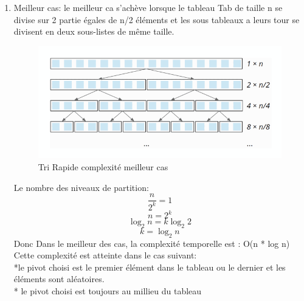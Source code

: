    \begin{enumerate}
    \item Meilleur cas: le meilleur ca s'achève lorsque le tableau Tab de taille n se divise sur 2 partie égales de n/2 éléments et les sous tableaux a leurs tour se divisent en deux sous-listes de même taille.
      \begin{figure} [H]
        \centering
        \includegraphics[scale=0.45]{ressources/Quicksort_best_case_time_complexity.png}
        \caption{Tri Rapide complexité meilleur cas }
        \label{fig:rapide}
     \end{figure}
     
    Le nombre des niveaux de partition:
    \[
   \frac{n}{2^k}=1
   \]
    \[
   n=2^k
   \]
    \[
   \log_2 n = k \log_2 2
   \]
  \[
   k= \log_2 n
  \]
  Donc Dans le meilleur des cas, la complexité temporelle est : O(n * log n)\\
  Cette complexité est atteinte dans le cas suivant:\\
    *le pivot choisi est le premier élément dans le tableau ou le dernier et les éléments sont aléatoires.\\
    * le pivot choisi est toujours au millieu du tableau
     

\end{enumerate}
